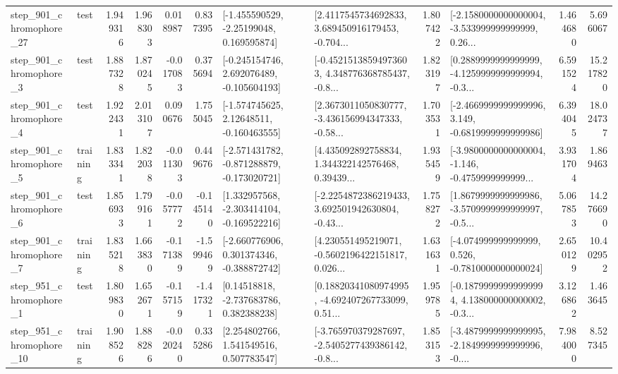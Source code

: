 \begin{tabular}{llrrrrllrlrr}
  step\_901\_chromophore\_27 &      test &      1.949316 &    1.968303 &      0.018987 &  0.837395 &    [-1.455590529, -2.25199048, 0.169595874] &  [2.4117545734692833, 3.689450916179453, -0.704... &       1.807422 &  [-2.1580000000000004, -3.533999999999999, 0.26... &            1.464680 &          5.696067 \\
   step\_901\_chromophore\_3 &      test &      1.887328 &    1.870245 &     -0.017083 &  0.375694 &   [-0.245154746, 2.692076489, -0.105604193] &  [-0.45215138594973603, 4.348776368785437, -0.8... &       1.823197 &  [0.2889999999999999, -4.1259999999999994, -0.3... &            6.591524 &         15.217820 \\
   step\_901\_chromophore\_4 &      test &      1.922431 &    2.013107 &      0.090676 &  1.755045 &    [-1.574745625, 2.12648511, -0.160463555] &  [2.3673011050830777, -3.436156994347333, -0.58... &       1.703531 &  [-2.4669999999999996, 3.149, -0.6819999999999986] &            6.394045 &         18.024737 \\
   step\_901\_chromophore\_5 &  training &      1.833341 &    1.822038 &     -0.011303 &  0.449676 &  [-2.571431782, -0.871288879, -0.173020721] &  [4.435092892758834, 1.344322142576468, 0.39439... &       1.935459 &  [-3.9800000000000004, -1.146, -0.4759999999999... &            3.931704 &          1.869463 \\
   step\_901\_chromophore\_6 &      test &      1.856933 &    1.799161 &     -0.057772 & -0.145140 &   [1.332957568, -2.303414104, -0.169522216] &  [-2.2254872386219433, 3.692501942630804, -0.43... &       1.758272 &  [1.8679999999999986, -3.5709999999999997, -0.5... &            5.067853 &         14.276690 \\
   step\_901\_chromophore\_7 &  training &      1.835218 &    1.663830 &     -0.171389 & -1.599469 &   [-2.660776906, 0.301374346, -0.388872742] &  [4.230551495219071, -0.5602196422151817, 0.026... &       1.631631 &   [-4.074999999999999, 0.526, -0.7810000000000024] &            2.650129 &         10.402952 \\
   step\_951\_chromophore\_1 &      test &      1.809830 &    1.652671 &     -0.157159 & -1.417321 &     [0.14518818, -2.737683786, 0.382388238] &  [0.18820341080974995, -4.692407267733099, 0.51... &       1.959785 &  [-0.18799999999999994, 4.138000000000002, -0.3... &            3.126862 &          1.463645 \\
  step\_951\_chromophore\_10 &  training &      1.908526 &    1.888286 &     -0.020240 &  0.335286 &     [2.254802766, 1.541549516, 0.507783547] &  [-3.765970379287697, -2.5405277439386142, -0.8... &       1.853153 &  [-3.4879999999999995, -2.1849999999999996, -0.... &            7.984000 &          8.527345 \\

\end{tabular}
